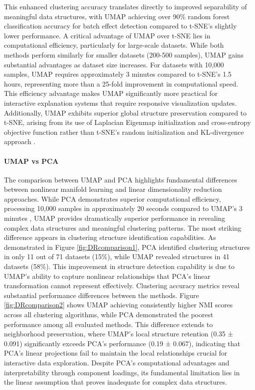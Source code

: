 This enhanced clustering accuracy translates directly to improved separability of meaningful data structures, with UMAP achieving over 90\% random forest classification accuracy for batch effect detection compared to t-SNE's slightly lower performance.
A critical advantage of UMAP over t-SNE lies in computational efficiency, particularly for large-scale datasets. 
While both methods perform similarly for smaller datasets (200-500 samples), UMAP gains substantial advantages as dataset size increases. For datasets with 10,000 samples, UMAP requires approximately 3 minutes compared to t-SNE's 1.5 hours, representing more than a 25-fold improvement in computational speed. This efficiency advantage makes UMAP significantly more practical for interactive explanation systems that require responsive visualization updates.
Additionally, UMAP exhibits superior global structure preservation compared to t-SNE, arising from its use of Laplacian Eigenmap initialization and cross-entropy objective function rather than t-SNE's random initialization and KL-divergence approach \cite{yang2021dimensionality}. 

\paragraph{UMAP vs PCA}
The comparison between UMAP and PCA highlights fundamental differences between nonlinear manifold learning and linear dimensionality reduction approaches. While PCA demonstrates superior computational efficiency, processing 10,000 samples in approximately 20 seconds compared to UMAP's 3 minutes \cite{yang2021dimensionality}, UMAP provides dramatically superior performance in revealing complex data structures and meaningful clustering patterns.
The most striking difference appears in clustering structure identification capabilities. As demonstrated in Figure \ref{fig:DRcomparison1}, PCA identified clustering structures in only 11 out of 71 datasets (15\%), while UMAP revealed structures in 41 datasets (58\%). This improvement in structure detection capability is due to UMAP's ability to capture nonlinear relationships that PCA's linear transformation cannot represent effectively.
Clustering accuracy metrics reveal substantial performance differences between the methods. Figure \ref{fig:DRcomparison2} shows UMAP achieving consistently higher NMI scores across all clustering algorithms, while PCA demonstrated the poorest performance among all evaluated methods. This difference extends to neighborhood preservation, where UMAP's local structure retention (0.35 ± 0.091) significantly exceeds PCA's performance (0.19 ± 0.067), indicating that PCA's linear projections fail to maintain the local relationships crucial for interactive data exploration.
Despite PCA's computational advantages and interpretability through component loadings, its fundamental limitation lies in the linear assumption that proves inadequate for complex data structures. 

